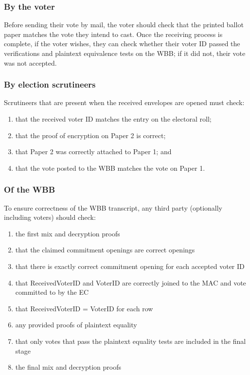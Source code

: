\documentclass[11pt,twoside,a4paper]{article}
\theoremstyle{definition}
\begin{document}
\subsubsection{By the voter}
Before sending their vote by mail, the voter should check that the printed ballot paper matches the vote they intend to cast. Once the receiving process is complete, if the voter wishes, they can check whether their voter ID passed the verifications and plaintext equivalence tests on the WBB; if it did not, their vote was not accepted.

\subsubsection{By election scrutineers}
Scrutineers that are present when the received envelopes are opened must check:
\begin{enumerate}
	\item that the received voter ID matches the entry on the electoral roll;
	\item that the proof of encryption on Paper 2 is correct;
	\item that Paper 2 was correctly attached to Paper 1; and
	\item that the vote posted to the WBB matches the vote on Paper 1.
\end{enumerate}

\subsubsection{Of the WBB}
To ensure correctness of the WBB transcript, any third party (optionally including voters) should check:
\begin{enumerate}
	\item the first mix and decryption proofs
	\item that the claimed commitment openings are correct openings
	\item that there is exactly correct commitment opening for each accepted voter ID
	\item that ReceivedVoterID and VoterID are correctly joined to the MAC and vote committed to by the EC
	\item that ReceivedVoterID = VoterID for each row
	\item any provided proofs of plaintext equality
	\item that only votes that pass the plaintext equality tests are included in the final stage
	\item the final mix and decryption proofs
\end{enumerate}
\end{document}

